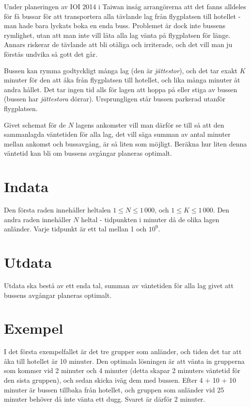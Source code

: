 
Under planeringen av IOI 2014 i Taiwan insåg arrangörerna att det fanns alldeles för få bussar för att transportera alla tävlande lag från flygplatsen till hotellet - man hade bara lyckats boka en enda buss. Problemet är dock inte bussens rymlighet, utan att man inte vill låta alla lag vänta på flygplatsen för länge. Annars riskerar de tävlande att bli otåliga och irriterade, och det vill man ju förstås undvika så gott det går.

Bussen kan rymma godtyckligt många lag (den är \emph{jättestor}), och det tar exakt $K$ minuter för den att åka från flygplatsen till hotellet, och lika många minuter åt andra hållet. Det tar ingen tid alls för lagen att hoppa på eller stiga av bussen (bussen har \emph{jättestora} dörrar). Ursprungligen står bussen parkerad utanför flygplatsen.

Givet schemat för de $N$ lagens ankomster vill man därför se till så att den sammanlagda väntetiden för alla lag, det vill säga summan av antal minuter mellan ankomst och bussavgång, är så liten som möjligt. Beräkna hur liten denna väntetid kan bli om bussens avgångar planeras optimalt.

\section*{Indata}
Den första raden innehåller heltalen $1 \leq N \leq 1\,000$, och $1 \leq K \leq 1\,000$.
Den andra raden innehåller $N$ heltal - tidpunkten i minuter då de olika lagen anländer. Varje tidpunkt är ett tal mellan 1 och $10^9$.

\section*{Utdata}
Utdata ska bestå av ett enda tal, summan av väntetiden för alla lag givet att bussens avgångar planeras optimalt.

\section*{Exempel}
I det första exempelfallet är det tre grupper som anländer, och tiden det tar att åka till hotellet är 10 minuter. Den optimala lösningen är att vänta in grupperna som kommer vid 2 minuter och 4 minuter (detta skapar 2 minuters väntetid för den sista gruppen), och sedan skicka iväg dem med bussen. Efter 4 + 10 + 10 minuter är bussen tillbaka från hotellet, och gruppen som anländer vid 25 minuter behöver då inte vänta ett dugg. Svaret är därför 2 minuter.

